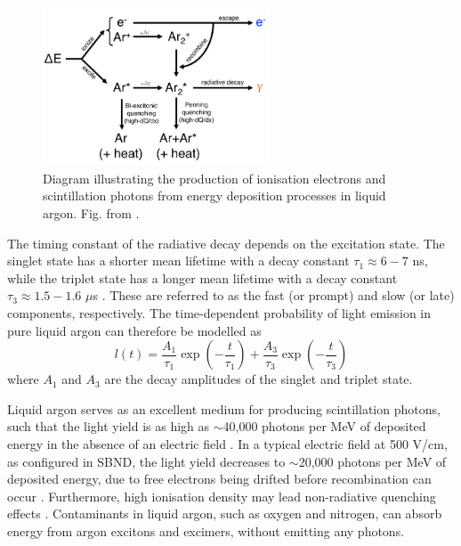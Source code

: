 \begin{figure}[hbtp] 
\centering    
\includegraphics[width=0.6\textwidth]{recomb_diagram}
\caption[recomb_diagram]{
Diagram illustrating the production of ionisation electrons and scintillation photons from energy deposition processes in liquid argon.
Fig. from \cite{Lariat}.
}
\label{fig:recomb_diagram}
\end{figure}

The timing constant of the radiative decay depends on the excitation state.
The singlet state has a shorter mean lifetime with a decay constant $\tau_{1} \approx 6 - 7$ ns, while the triplet state has a longer mean lifetime with a decay constant $\tau_{3} \approx 1.5 - 1.6$ $\mu$s \cite{photon_lifetime}.
These are referred to as the fast (or prompt) and slow (or late) components, respectively. 
The time-dependent probability of light emission in pure liquid argon can therefore be modelled as
\begin{equation}
	l(t)=\frac{A_{1}}{\tau_{1}}\exp{\left(-\frac{t}{\tau_{1}}\right)} +\frac{A_{3}}{\tau_{3}}\exp{\left(-\frac{t}{\tau_{3}}\right)}
\end{equation}
where $A_{1}$ and $A_{3}$ are the decay amplitudes of the singlet and triplet state. 


Liquid argon serves as an excellent medium for producing scintillation photons, such that the light yield is as high as $\sim$40,000 photons per MeV of deposited energy in the absence of an electric field \cite{light_yield}.
In a typical electric field at 500 V/cm, as configured in SBND, the light yield decreases to $\sim$20,000 photons per MeV of deposited energy, due to free electrons being drifted before recombination can occur \cite{light_yield_Efield}.
Furthermore, high ionisation density may lead non-radiative quenching effects \cite{Lariat}.
Contaminants in liquid argon, such as oxygen and nitrogen, can absorb energy from argon excitons and excimers, without emitting any photons.
 
